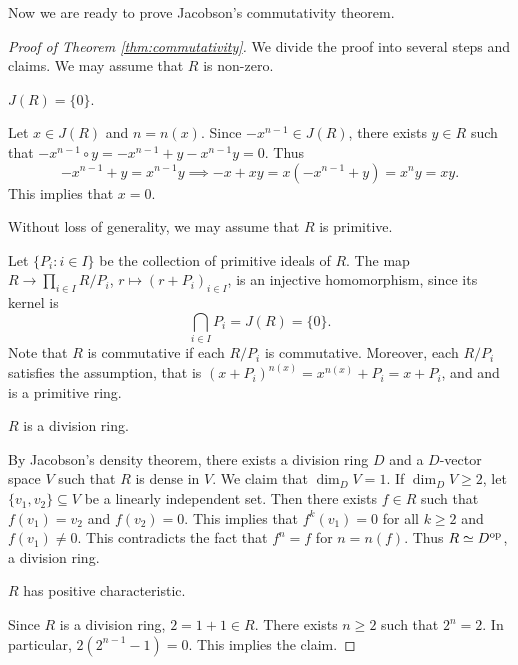 Now we are ready to prove Jacobson's commutativity theorem. 

\begin{proof}[Proof of Theorem \ref{thm:commutativity}]
    We divide the proof into several steps and claims. We may assume that 
    $R$ is non-zero. 
    
    \begin{claim}
        $J(R)=\{0\}$. 
    \end{claim}
    
    Let $x\in J(R)$ and $n=n(x)$. Since $-x^{n-1}\in J(R)$, 
    there exists $y\in R$ such that $-x^{n-1}\circ y=-x^{n-1}+y-x^{n-1}y=0$. Thus
    \[
    -x^{n-1}+y=x^{n-1}y\implies
    -x+xy=x(-x^{n-1}+y)=x^ny=xy.
    \]
    This implies that $x=0$.
    
    \begin{claim}
        Without loss of generality, we may assume that $R$ is primitive. 
    \end{claim}
	
	Let $\{P_i:i\in I\}$ be the collection of primitive ideals of $R$. 
	The map 
	$R\to \prod_{i\in I}R/P_i$, $r\mapsto (r+P_i)_{i\in I}$, 
	is an injective homomorphism, since
	its kernel is 
	\[
	\bigcap_{i\in I} P_i=J(R)=\{0\}.
	\]
	Note that
	$R$ is commutative if each $R/P_i$ is commutative.        Moreover, 
	each $R/P_i$ 
	satisfies the assumption, that is 
	$(x+P_i)^{n(x)}=x^{n(x)}+P_i=x+P_i$, and 
	and is a primitive ring. 
	
    \begin{claim}
        $R$ is a division ring. 
    \end{claim}

    By Jacobson's density theorem,
    there exists a division ring $D$ and 
    a $D$-vector space $V$ such that 
    $R$ is dense in $V$. We claim that $\dim_DV=1$. If $\dim_DV\geq 2$, 
    let $\{v_1,v_2\}\subseteq V$ be a linearly independent set. Then
    there exists $f\in R$ such that $f(v_1)=v_2$ and $f(v_2)=0$. This implies
    that $f^{k}(v_1)=0$ for all $k\geq 2$ and $f(v_1)\ne 0$. This contradicts
    the fact that $f^{n}=f$ for $n=n(f)$. Thus $R\simeq D^{\operatorname{op}}$, 
    a division ring. 
    
    \begin{claim}
        $R$ has positive characteristic. 
    \end{claim}

    Since $R$ is a division ring, $2=1+1\in R$. There exists $n\geq2$ 
    such that $2^n=2$. In particular, 
    $2(2^{n-1}-1)=0$. This implies the claim. 
    

\end{proof}
